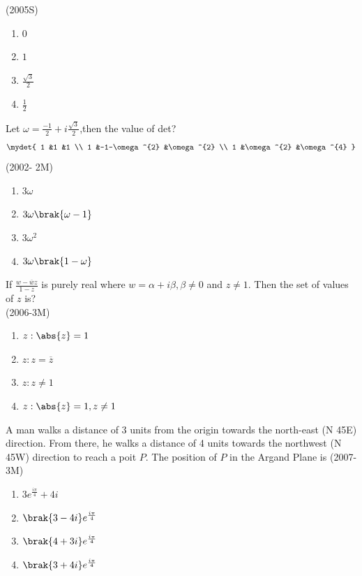         \hfill{(2005S)}
		\begin{multicols}{4}
\begin{enumerate}
	\item $0$
	\item $1$
	\item $\frac{\sqrt{3}}{2}$
	\item $\frac{1}{2}$
\end{enumerate}
                 \end{multicols}

\item Let $\omega=\frac{-1}{2}+i\frac{\sqrt{3}}{2}$,then the value of det?\\
	\begin{align}
		\mydet{
	1     &1               &1            \\
	1     &-1-\omega^{2}   &\omega^{2}   \\
	1     &\omega^{2}      &\omega^{4}
                      }
	\end{align}
	\hfill{(2002- 2M)}
		\begin{multicols}{2}
\begin{enumerate}
	\item $3\omega$
	\item $3\omega\brak{\omega-1}$
	\item $3\omega^{2}$
	\item $3\omega\brak{1-\omega}$
\end{enumerate}
		\end{multicols}

\item If $\frac{w-\overline{w}z}{1-z}$ is purely real where $w=\alpha+i\beta, \beta \neq 0$ and $z \neq 1$. Then the set of values of $z$ is?                     \\

	\hfill{(2006-3M)}
		\begin{multicols}{2}
\begin{enumerate}
	\item {$z:\abs{z}=1$}
	\item {$z:z= \overline{z}$}
	\item {$z:z \neq 1 $}
	\item {$z:\abs{z}=1, z\neq1$}
\end{enumerate}
		\end{multicols}

\item A man walks a distance of 3 units from the origin towards the north-east (N 45\degree E) direction. From there, he walks a distance of 4 units towards the northwest (N 45\degree W) direction to reach a poit $P$. The position of $P$ in the Argand Plane is \hfill{(2007-3M)}
	\begin{multicols}{2}
\begin{enumerate}
	\item $3e^{\frac{i\pi}{4}}+4i$
	\item $\brak{3-4i}e^{\frac{i\pi}{4}}$
	\item $\brak{4+3i}e^{\frac{i\pi}{4}}$
	\item $\brak{3+4i}e^{\frac{i\pi}{4}}$
\end{enumerate}
	\end{multicols}

